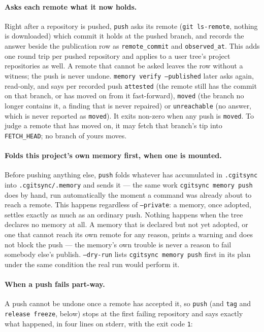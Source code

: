 \paragraph{Asks each remote what it now holds.}
Right after a repository is pushed, \texttt{push} asks its remote
(\texttt{git ls-remote}, nothing is downloaded) which commit it holds at the
pushed branch, and records the answer beside the publication row as
\texttt{remote\_commit} and \texttt{observed\_at}. This adds one round trip
per pushed repository and applies to a user tree's project repositories as
well. A remote that cannot be asked leaves the row without a witness; the
push is never undone. \texttt{memory verify --published} later asks again,
read-only, and says per recorded push \texttt{attested} (the remote still
has the commit on that branch, or has moved on from it fast-forward),
\texttt{moved} (the branch no longer contains it, a finding that is never
repaired) or \texttt{unreachable} (no answer, which is never reported as
\texttt{moved}). It exits non-zero when any push is \texttt{moved}. To judge a
remote that has moved on, it may fetch that branch's tip into
\texttt{FETCH\_HEAD}; no branch of yours moves.

\paragraph{Folds this project's own memory first, when one is mounted.}
Before pushing anything else, \texttt{push} folds whatever has accumulated
in \texttt{.cgitsync} into \texttt{.cgitsync/.memory} and sends it --- the
same work \texttt{cgitsync memory push} does by hand, run automatically the
moment a command was already about to reach a remote. This happens
regardless of \texttt{--private}: a memory, once adopted, settles exactly
as much as an ordinary push. Nothing happens when the tree declares no
memory at all. A memory that is declared but not yet adopted, or one that
cannot reach its own remote for any reason, prints a warning and does not
block the push --- the memory's own trouble is never a reason to fail
somebody else's publish. \texttt{--dry-run} lists \texttt{cgitsync memory
push} first in its plan under the same condition the real run would
perform it.

\paragraph{When a push fails part-way.}\label{sec:partial-failure}
A push cannot be undone once a remote has accepted it, so \texttt{push} (and
\texttt{tag} and \texttt{release freeze}, below) stops at the first failing
repository and says exactly what happened, in four lines on stderr, with the
exit code \texttt{1}:

